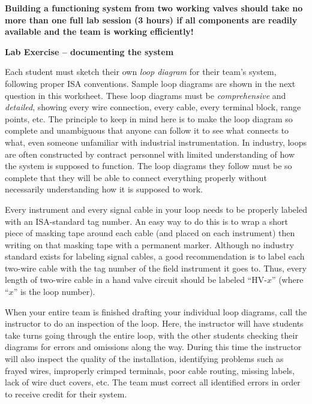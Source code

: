 \documentclass[12pt,a4paper]{article}
\begin{document}
\begin{itemize}
\vskip 10pt

{\bf Building a functioning system from two working valves should take no more than one full lab session (3 hours) if all components are readily available and the team is working efficiently!}





\vfil \eject

\noindent
{\bf Lab Exercise -- documenting the system}

\vskip 5pt

Each student must sketch their own {\it loop diagram} for their team's system, following proper ISA conventions.  Sample loop diagrams are shown in the next question in this worksheet.  These loop diagrams must be {\it comprehensive} and {\it detailed}, showing every wire connection, every cable, every terminal block, range points, etc.  The principle to keep in mind here is to make the loop diagram so complete and unambiguous that anyone can follow it to see what connects to what, even someone unfamiliar with industrial instrumentation.  In industry, loops are often constructed by contract personnel with limited understanding of how the system is supposed to function.  The loop diagrams they follow must be so complete that they will be able to connect everything properly without necessarily understanding how it is supposed to work.

Every instrument and every signal cable in your loop needs to be properly labeled with an ISA-standard tag number.  An easy way to do this is to wrap a short piece of masking tape around each cable (and placed on each instrument) then writing on that masking tape with a permanent marker.  Although no industry standard exists for labeling signal cables, a good recommendation is to label each two-wire cable with the tag number of the field instrument it goes to.  Thus, every length of two-wire cable in a hand valve circuit should be labeled ``HV-$x$'' (where ``$x$'' is the loop number).  

When your entire team is finished drafting your individual loop diagrams, call the instructor to do an inspection of the loop.  Here, the instructor will have students take turns going through the entire loop, with the other students checking their diagrams for errors and omissions along the way.  During this time the instructor will also inspect the quality of the installation, identifying problems such as frayed wires, improperly crimped terminals, poor cable routing, missing labels, lack of wire duct covers, etc.  The team must correct all identified errors in order to receive credit for their system.  


\end{itemize}
\end{document}
